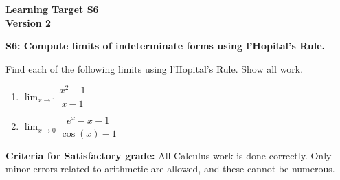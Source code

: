 \documentclass[10pt]{article}
\begin{document}
	\vspace*{0in}

		\begin{center}
			\textbf{Learning Target S6 \\
			Version 2} 
		\end{center}


\begin{framed}
	\textbf{S6: Compute limits of indeterminate forms using l'Hopital's Rule.}
\end{framed}

Find each of the following limits using l'Hopital's Rule. Show all work. 

\begin{enumerate}
    \item $\displaystyle{\lim_{x \to 1} \dfrac{x^2 - 1}{x - 1}}$
    \item $\displaystyle{\lim_{x \to 0} \dfrac{e^x - x - 1}{\cos(x) - 1}}$
\end{enumerate}

\vfill


\begin{small}
    \begin{framed}
        	\textbf{Criteria for Satisfactory grade:} All Calculus work is done correctly. Only minor errors related to arithmetic are allowed, and these cannot be numerous. 
    \end{framed}

\end{small}
\end{document}
